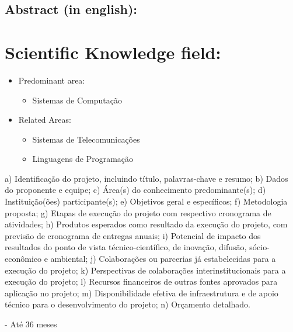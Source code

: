 \documentclass[titlepage,12pt]{article}
\begin{document}
\subsection{ Abstract (in english): }


\section{ Scientific Knowledge field: }

\begin{itemize}
\item Predominant area:
    \begin{itemize}
    \item Sistemas de Computação 	
    \end{itemize}
\item Related Areas: 	
    \begin{itemize}
    \item Sistemas de Telecomunicações
    \item Linguagens de Programação
    \end{itemize}
\end{itemize}

a) Identificação do projeto, incluindo título, palavras-chave e resumo;
b) Dados do proponente e equipe;
c) Área(s) do conhecimento predominante(s);
d) Instituição(ões) participante(s);
e) Objetivos geral e específicos;
f) Metodologia proposta;
g) Etapas de execução do projeto com respectivo cronograma de atividades;
h) Produtos esperados como resultado da execução do projeto, com previsão de cronograma
de entregas anuais;
i) Potencial de impacto dos resultados do ponto de vista técnico-científico, de inovação,
difusão, sócio-econômico e ambiental;
j) Colaborações ou parcerias já estabelecidas para a execução do projeto;
k) Perspectivas de colaborações interinstitucionais para a execução do projeto;
l) Recursos financeiros de outras fontes aprovados para aplicação no projeto;
m) Disponibilidade efetiva de infraestrutura e de apoio técnico para o desenvolvimento do
projeto;
n) Orçamento detalhado.

- Até 36 meses
\end{document}
